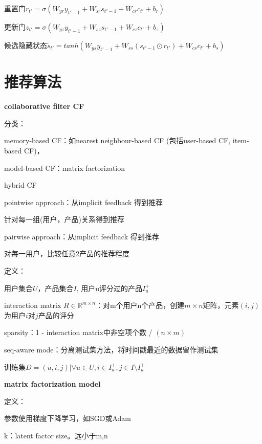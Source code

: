 \documentclass[UTF8]{ctexart}
\begin{document}
  \quad \quad 重置门$r_{t'} = \sigma(W_{yr}y_{t'-1} + W_{sr}s_{t'-1} + W_{cr}c_{t'} + b_r)$
  
  \quad \quad 更新门$z_{t'} = \sigma(W_{yz}y_{t'-1} + W_{sz}s_{t'-1} + W_{cz}c_{t'} + b_z)$

  \quad \quad 候选隐藏状态$\tilde{s}_{t'} = tanh(W_{ys}y_{t'-1} + W_{ss}(s_{t'-1} \odot r_{t'}) + W_{cs}c_{t'} + b_s)$

\section{推荐算法}
\noindent \textbf{collaborative filter CF}

  分类：
  
  \quad memory-based CF：如nearest neighbour-based CF (包括user-based CF, item-based CF)，
  
  \quad model-based CF：matrix factorization 
  
  \quad hybrid CF

  \quad pointwise approach：从implicit feedback 得到推荐

  \quad \quad 针对每一组(用户，产品)关系得到推荐

  \quad pairwise approach：从implicit feedback 得到推荐

  \quad \quad 对每一用户，比较任意2产品的推荐程度

  定义：

  \quad 用户集合$U$，产品集合$I$, 用户u评分过的产品$I_u^+$

  \quad interaction matrix $R \in \mathbb{R}^{m \times n}$：对m个用户n个产品，创建$m \times n$矩阵，元素$(i, j)$为用户$i$对$j$产品的评分

  \quad sparsity：1 - interaction matrix中非空项个数 / $(n \times m)$

  \quad seq-aware mode：分离测试集方法，将时间戳最近的数据留作测试集

  \quad 训练集$D = {(u, i, j) | \forall u \in U, i \in I_u^+, j \in I \setminus I_u^+}$


  \textbf{matrix factorization model}

  \quad 定义：

  \quad \quad 参数使用梯度下降学习，如SGD或Adam

  \quad \quad k：latent factor size。远小于m,n
\end{document}
